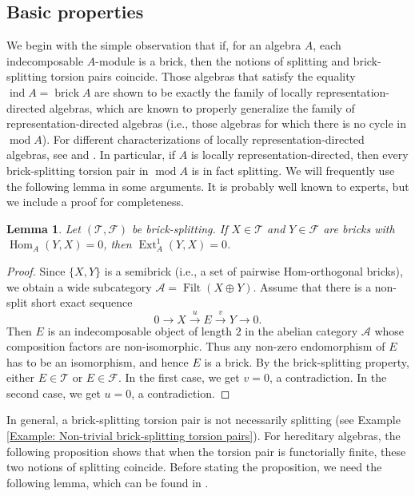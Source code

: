 \documentclass{amsart}
\theoremstyle{thmstyle}
\newtheorem{lemma}[thm]{Lemma}
\theoremstyle{exstyle}
\theoremstyle{defstyle}
\theoremstyle{remstyle}
\theoremstyle{remstyle}
\newcommand{\Hom}{\operatorname{Hom}}
\newcommand{\Ext}{\operatorname{Ext}}
\DeclareMathOperator*{\modu}{mod}
\DeclareMathOperator*{\Filt}{Filt}
\DeclareMathOperator*{\ind}{ind}
\DeclareMathOperator*{\brick}{brick}
\begin{document}
\subsection{Basic properties}
We begin with the simple observation that if, for an algebra $A$, each indecomposable $A$-module is a brick, then the notions of splitting and brick-splitting torsion pairs coincide. Those algebras that satisfy the equality $\ind A=\brick A$ are shown to be exactly the family of locally representation-directed algebras, which are known to properly generalize the family of representation-directed algebras (i.e., those algebras for which there is no cycle in $\modu A$). For different characterizations of locally representation-directed algebras, see \cite{Dr} and \cite{MP1}. In particular, if $A$ is locally representation-directed, then every brick-splitting torsion pair in $\modu A$ is in fact splitting. 
We will frequently use the following lemma in some arguments. It is probably well known to experts, but we include a proof for completeness.

\begin{lemma} \label{Lemma: brick-splitting implies no Ext between bricks}
    Let $(\mathcal{T}, \mathcal{F})$ be brick-splitting. 
    If $X\in\mathcal{T}$ and $Y\in\mathcal{F}$ are bricks with $\Hom_A(Y,X)=0$, then $\Ext^1_A(Y,X)=0$.
\end{lemma}

\begin{proof}
Since $\{X,Y\}$ is a semibrick (i.e., a set of pairwise Hom-orthogonal bricks), we obtain a wide subcategory $\mathcal{A}=\Filt(X\oplus Y)$.
Assume that there is a non-split short exact sequence
    $$0 \to X \stackrel{u}{\to} E \stackrel{v}{\to} Y \to 0.$$
Then $E$ is an indecomposable object of length $2$ in the abelian category $\mathcal{A}$ whose composition factors are non-isomorphic. Thus any non-zero endomorphism of $E$ has to be an isomorphism, and hence $E$ is a brick. 
By the brick-splitting property, either $E \in \mathcal{T}$ or $E \in \mathcal{F}$. In the first case, we get $v=0$, a contradiction. In the second case, we get $u=0$, a contradiction.
\end{proof}

In general, a brick-splitting torsion pair is not necessarily splitting (see Example \ref{Example: Non-trivial brick-splitting torsion pairs}). For hereditary algebras, the following proposition shows that when the torsion pair is functorially finite, these two notions of splitting coincide. Before stating the proposition, we need the following lemma, which can be found in \cite[Chapter IV, Lemma 1.5]{Ha}.
\end{document}
